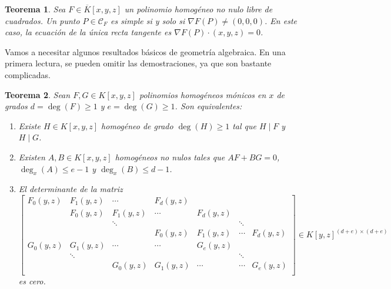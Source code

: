 \documentclass[a4paper, 11pt]{article}
\newcounter{numerodetema}
\theoremstyle{plain}
\newtheorem{teor}{Teorema}[numerodetema]
\theoremstyle{definition}
\begin{document}
\begin{teor}
Sea $F\in\overline{K}[x,y,z]$ un polinomio homogéneo no nulo libre de cuadrados.
Un punto $P\in\mathcal{C}_F$ es simple si y solo si $\nabla F(P)\neq (0,0,0)$. En
este caso, la ecuación de la única recta tangente es $\nabla F(P)\cdot (x,y,z)=0$.
\end{teor}

\bigskip

Vamos a necesitar algunos resultados básicos de geometría algebraica. En una primera
lectura, se pueden omitir las demostraciones, ya que son bastante complicadas.

\begin{teor}\label{teor-1}
Sean $F,G\in K[x,y,z]$ polinomios homogéneos mónicos en $x$ de grados $d=\deg(F)\geq 1$
y $e=\deg(G)\geq 1$.
Son equivalentes:
\begin{enumerate}
\item Existe $H\in K[x,y,z]$ homogéneo de grado $\deg(H)\geq 1$ tal que $H\mid F$
y $H\mid G$.
\item Existen $A,B\in K[x,y,z]$ homogéneos no nulos tales que $AF+BG=0$, $\deg_x(A)\leq e-1$
y $\deg_x(B)\leq d-1$.
\item El determinante de la matriz
\[
\left[
\begin{array}{ccccccc}
F_0(y,z) & F_1(y,z) & \cdots   & F_d(y,z) &          &        &          \\
         & F_0(y,z) & F_1(y,z) & \cdots   & F_d(y,z) &        &          \\
         &          & \ddots   &          &          & \ddots &          \\
         &          &          & F_0(y,z) & F_1(y,z) & \cdots & F_d(y,z) \\
G_0(y,z) & G_1(y,z) & \cdots   & \cdots   & G_e(y,z) &        &          \\
         & \ddots   &          &          &          & \ddots &          \\
         &          & G_0(y,z) & G_1(y,z) & \cdots   & \cdots & G_e(y,z) \\
\end{array}
\right]\in K[y,z]^{(d+e)\times(d+e)}
\]
es cero.
\end{enumerate}
\end{teor}
\end{document}
